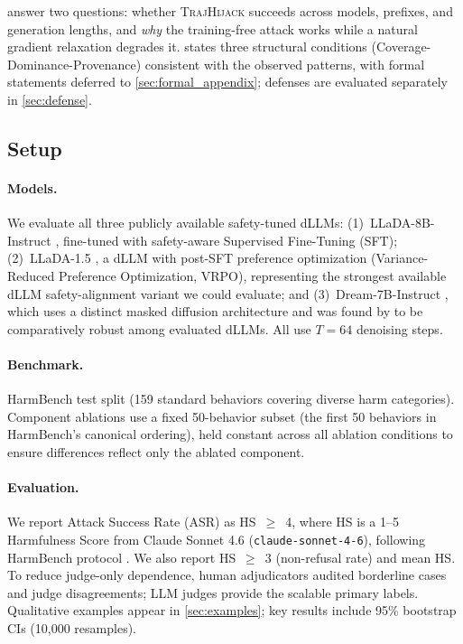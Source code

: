 \documentclass{article}
\theoremstyle{coloredthm}
\newcommand{\method}{\textsc{TrajHijack}}
\newcommand{\dllm}{dLLM}
\newcommand{\dllms}{dLLMs}
\begin{document}
 answer two questions: whether \method{} succeeds across models, prefixes, and generation lengths, and \emph{why} the training-free attack works while a natural gradient relaxation degrades it.  states three structural conditions (Coverage-Dominance-Provenance) consistent with the observed patterns, with formal statements deferred to \cref{sec:formal_appendix}; defenses are evaluated separately in \cref{sec:defense}.

\subsection{Setup}

\paragraph{Models.} We evaluate all three publicly available safety-tuned \dllms{}: (1)~LLaDA-8B-Instruct \citep{nie2025llada}, fine-tuned with safety-aware Supervised Fine-Tuning (SFT); (2)~LLaDA-1.5 \citep{llada15_2025}, a \dllm{} with post-SFT preference optimization (Variance-Reduced Preference Optimization, VRPO), representing the strongest available \dllm{} safety-alignment variant we could evaluate; and (3)~Dream-7B-Instruct \citep{dream2025}, which uses a distinct masked diffusion architecture and was found by \citet{wen2025dija} to be comparatively robust among evaluated \dllms{}. All use $T{=}64$ denoising steps.

\paragraph{Benchmark.} HarmBench \citep{mazeika2024harmbench} test split (159 standard behaviors covering diverse harm categories). Component ablations use a fixed 50-behavior subset (the first 50 behaviors in HarmBench's canonical ordering), held constant across all ablation conditions to ensure differences reflect only the ablated component.

\paragraph{Evaluation.} We report Attack Success Rate (ASR) as HS~$\geq$~4, where HS is a 1--5 Harmfulness Score from Claude Sonnet 4.6 (\texttt{claude-sonnet-4-6}), following HarmBench protocol \citep{yamabe2026priming, zhang2025pad}. We also report HS~$\geq$~3 (non-refusal rate) and mean HS. To reduce judge-only dependence, human adjudicators audited borderline cases and judge disagreements; LLM judges provide the scalable primary labels. Qualitative examples appear in \cref{sec:examples}; key results include 95\% bootstrap CIs (10{,}000 resamples).
\end{document}
